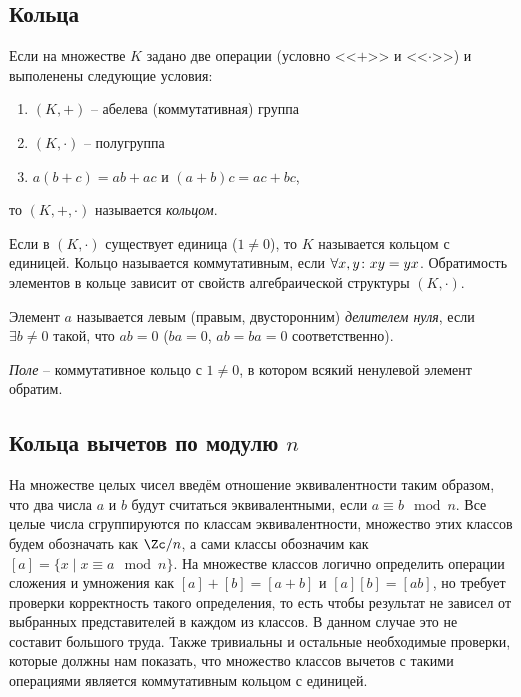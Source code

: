 \subsection{Кольца}

\begin{df}
  Если на множестве $K$ задано две операции (условно <<$+$>> и <<$\cdot$>>) и выполенены следующие условия:
  \begin{enumerate}
    \item $(K,+)$ -- абелева (коммутативная) группа
    \item $(K,\cdot)$ -- полугруппа
    \item $a(b+c)=ab+ac$ и $(a+b)c=ac+bc$,
  \end{enumerate}
  то $(K,+,\cdot)$ называется \emph{кольцом}.
  
  Если в $(K,\cdot)$ существует единица ($1\ne0$), то $K$ называется кольцом с единицей. Кольцо называется коммутативным, если $\forall x,y\colon xy=yx$. Обратимость элементов в кольце зависит от свойств алгебраической структуры $(K,\cdot)$.
\end{df}

\begin{df}
  Элемент $a$ называется левым (правым, двусторонним) \emph{делителем нуля}, если $\exists b\ne0$ такой, что $ab=0$ ($ba=0$, $ab=ba=0$ соответственно).
\end{df}

\begin{df}
  \emph{Поле} -- коммутативное кольцо с $1\ne0$, в котором всякий ненулевой элемент обратим.
\end{df}

\subsection{Кольца вычетов по модулю $n$}

На множестве целых чисел введём отношение эквивалентности таким
образом, что два числа $a$ и $b$ будут считаться эквивалентными, если
$a\equiv b \mod n$. Все целые числа сгруппируются по классам
эквивалентности, множество этих классов будем обозначать как $\Zc/n$,
а сами классы обозначим как $[a]=\{x\mid x\equiv a \mod n\}$. На
множестве классов логично определить операции сложения и умножения как
$[a]+[b]=[a+b]$ и $[a][b]=[ab]$, но требует проверки корректность
такого определения, то есть чтобы результат не зависел от выбранных
представителей в каждом из классов. В данном случае это не составит
большого труда. Также тривиальны и остальные необходимые проверки,
которые должны нам показать, что множество классов вычетов с такими
операциями является коммутативным кольцом с
единицей.

